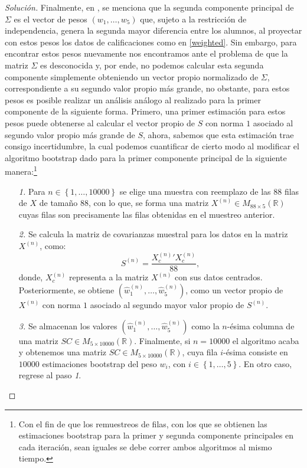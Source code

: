 \documentclass[10.5pt,notitlepage]{article}
\newenvironment{solucion}
  {\begin{proof}[Solución]}
  {\end{proof}}
\newcommand{\RR}{\mathbb{R}}
\newcommand{\kis}[1]{\left\{ #1 \right\}}
\theoremstyle{plain}
\begin{document}
\begin{solucion}
Finalmente, en \textcite{diaconis_computer-intensive_1983}, se menciona que la segunda componente principal de \(\Sigma\) es el vector de pesos \((w_1, \hdots, w_5)\) que, sujeto a la restricción de independencia, genera la segunda mayor diferencia entre los alumnos, al proyectar con estos pesos los datos de calificaciones como en \eqref{weighted}. Sin embargo, para encontrar estos pesos nuevamente nos encontramos ante el problema de que la matriz \(\Sigma\) es desconocida y, por ende, no podemos calcular esta segunda componente simplemente obteniendo un vector propio normalizado de \(\Sigma\), correspondiente a su segundo valor propio más grande, no obstante, para estos pesos es posible realizar  un análisis análogo al realizado para la primer componente de la siguiente forma. Primero, una primer estimación para estos pesos puede obtenerse al calcular el vector propio de \(S\) con norma \(1\) asociado al segundo valor propio más grande de \(S\), ahora, sabemos que esta estimación trae consigo incertidumbre, la cual podemos cuantificar de cierto modo al modificar el algoritmo bootstrap dado para la primer componente principal de la siguiente manera:\footnote{Con el fin de que los remuestreos de filas, con los que se obtienen las estimaciones bootstrap para la primer y segunda componente principales en cada iteración, sean iguales se debe correr ambos algoritmos al mismo tiempo.} 
\begin{itemize}
    \item[\textit{1.}] Para \(n \in \kis{1, \hdots, 10000}\) se elige una muestra con reemplazo de las \(88\) filas de \(X\) de tamaño \(88\), con lo que, se forma una matriz \(X^{(n)} \in M_{88 \times 5}(\RR)\) cuyas filas son precisamente las filas obtenidas en el muestreo anterior. 
    \item[\textit{2.}] Se calcula la matriz de covarianzas muestral para los datos en la matriz \(X^{(n)}\), como:
    \[S^{(n)} = \frac{X_{c}^{(n)}'X_{c}^{(n)}}{88},\]
    donde, \(X_{c}^{(n)}\) representa a la matriz \(X^{(n)}\) con sus datos centrados. Posteriormente, se obtiene \((\hat{w}_{1}^{(n)},\hdots, \hat{w}_{5}^{(n)})\), como un vector propio de \(X^{(n)}\) con norma \(1\) asociado al segundo mayor valor propio de \(S^{(n)}\).
     \item[\textit{3.}] Se almacenan los valores \((\hat{w}_{1}^{(n)},\hdots, \hat{w}_{5}^{(n)})\) como la \(n\)-ésima columna de una matriz \(SC \in M_{5\times 10000}(\RR)\). Finalmente, si \(n = 10000\) el algoritmo acaba y obtenemos una matriz \(SC \in M_{5\times 10000}(\RR)\), cuya fila \(i\)-ésima consiste en \(10000\) estimaciones bootstrap del peso \(w_i\), con \(i \in \kis{1, \hdots,5}\). En otro caso, regrese al paso \textit{1}. 

\end{itemize}
\end{solucion}
\end{document}
